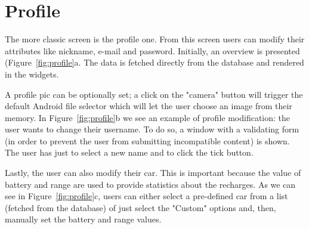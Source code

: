 \newpage
\section{Profile}
The more classic screen is the profile one. From this screen users can modify their attributes like nickname, e-mail and password.
Initially, an overview is presented (Figure~\ref{fig:profile}a. The data is fetched directly from the database and rendered in the widgets.

A profile pic can be optionally set; a click on the "camera" button will trigger the default Android file selector which will let the user choose an image from their memory.
In Figure~\ref{fig:profile}b we see an example of profile modification: the user wants to change their username. To do so, a window with a validating form (in order to prevent the user from submitting incompatible content) is shown. The user has just to select a new name and to click the tick button.

Lastly, the user can also modify their car. This is important because the value of battery and range are used to provide statistics about the recharges. As we can see in Figure~\ref{fig:profile}c, users can either select a pre-defined car from a list (fetched from the database) of just select the "Custom" options and, then, manually set the battery and range values.

